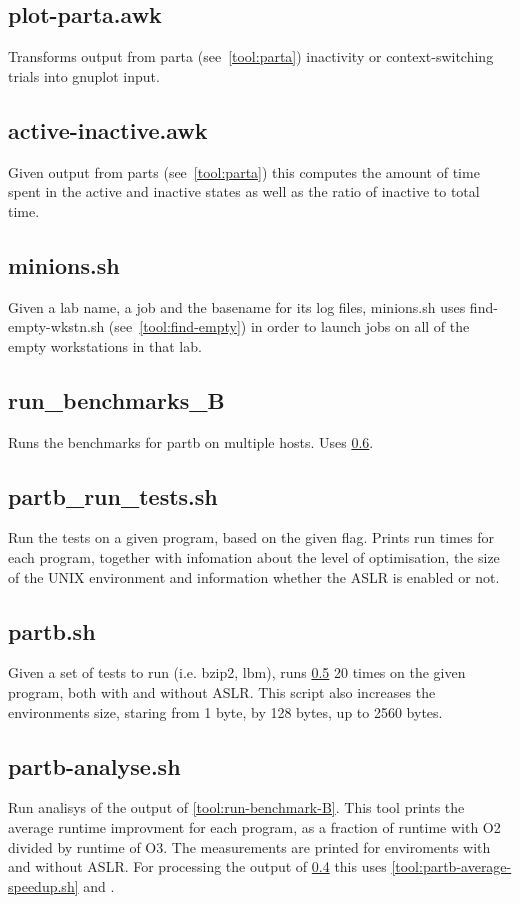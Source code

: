 \documentclass{article}
\begin{document}
\subsection{plot-parta.awk}
Transforms output from parta (see~\ref{tool:parta}) inactivity or 
context-switching trials into gnuplot input.

\subsection{active-inactive.awk} \label{tool:active-inactive}
Given output	 from parts (see~\ref{tool:parta}) this computes the amount of time
spent in the active and inactive states as well as the ratio of inactive to
total time.

\subsection{minions.sh} \label{tool:minions}
Given a lab name, a job and the basename for its log files, minions.sh
uses find-empty-wkstn.sh (see~\ref{tool:find-empty}) in order to launch jobs on
all of the empty workstations in that lab.

\subsection{run\_benchmarks\_B} \label{tool:run-benchmarks-B}
Runs the benchmarks for partb on multiple hosts. Uses \ref{tool:partb.sh}.

\subsection{partb\_run\_tests.sh} \label{tool:partb-run-tests.sh}
Run the tests on a given program, based on the given flag. Prints run times for each program, together with infomation about the level of optimisation, the size of the UNIX environment and information whether the ASLR is enabled or not.

\subsection{partb.sh} \label{tool:partb.sh}
Given a set of tests to run (i.e. bzip2, lbm), runs \ref{tool:partb-run-tests.sh} 20 times on the given program, both with and without ASLR. This script also increases the environments size, staring from 1 byte, by 128 bytes, up to 2560 bytes.


\subsection{partb-analyse.sh}
Run analisys of the output of \ref{tool:run-benchmark-B}. This tool prints the average runtime improvment for each program, as a fraction of runtime with O2 divided by runtime of O3. The measurements are printed for enviroments with and without ASLR. For processing the output of \ref{tool:run-benchmarks-B} this uses \ref{tool:partb-average-speedup.sh} and \label{tool:partb-average-speedup-aslr.sh}.
\end{document}
